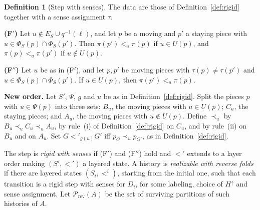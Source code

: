 \documentclass[11pt]{amsart}
\theoremstyle{definition}
\newtheorem{definition}[theorem]{Definition}
\theoremstyle{remark}
\newcommand{\Prev}{\mathcal{P}_{\mathrm{rev}}}
\newcommand{\up}{H^{\uparrow}}
\begin{document}
\begin{definition}[Step with senses]\label{def:sensestep}
The data are those of Definition~\ref{def:rigid} together with a sense assignment $\tau$.

\smallskip\noindent\textbf{(F$'$)} Let $u\notin E_S\cup q^{-1}(\ell)$, and let $p$ be a moving and $p'$
a staying piece with $u\in\Phi_S(p)\cap\Phi_S(p')$. Then $\pi(p')<_u\pi(p)$ if $u\in U(p)$, and
$\pi(p)<_u\pi(p')$ if $u\notin U(p)$.

\smallskip\noindent\textbf{(F$''$)} Let $u$ be as in (F$'$), and let $p,p'$ be moving pieces with
$\tau(p)\ne\tau(p')$ and $u\in\Phi_S(p)\cap\Phi_S(p')$. If $u\in U(p)$, then $\pi(p')<_u\pi(p)$.

\smallskip\noindent\textbf{New order.} Let $S'$, $\Psi$, $g$ and $u$ be as in Definition~\ref{def:rigid}.
Split the pieces $p$ with $u\in\Psi(p)$ into three sets: $B_u$, the moving pieces with $u\in U(p)$;
$C_u$, the staying pieces; and $A_u$, the moving pieces with $u\notin U(p)$. Define $\prec_u$ by
$B_u\prec_u C_u\prec_u A_u$, by rule~(i) of Definition~\ref{def:rigid} on $C_u$, and by rule~(ii) on
$B_u$ and on $A_u$. Set $G<'_{g(u)}G'$ iff $p_G\prec_u p_{G'}$, as in Definition~\ref{def:rigid}.

\smallskip
The step is \emph{rigid with senses} if (F$'$) and (F$''$) hold and $<'$ extends to a layer order
making $(S',<')$ a layered state. A history is \emph{realizable with reverse folds} if there are
layered states $(S_i,<^i)$, starting from the initial one, such that each transition is a rigid step
with senses for $D_i$, for some labeling, choice of $\up$ and sense assignment. Let
$\Prev(A)$ be the set of surviving partitions of such histories of $A$.
\end{definition}
\end{document}
